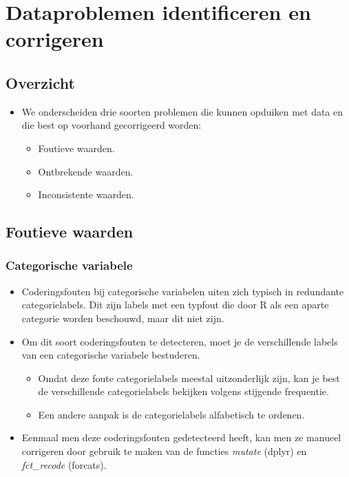 \documentclass[]{tufte-book}
\providecommand{\tightlist}{%
  \setlength{\itemsep}{0pt}\setlength{\parskip}{0pt}}
\begin{document}
\hypertarget{dataproblemen-identificeren-en-corrigeren}{%
\section{Dataproblemen identificeren en corrigeren}\label{dataproblemen-identificeren-en-corrigeren}}

\hypertarget{overzicht}{%
\subsection{Overzicht}\label{overzicht}}

\begin{itemize}
\tightlist
\item
  We onderscheiden drie soorten problemen die kunnen opduiken met data en die best op voorhand gecorrigeerd worden:

  \begin{itemize}
  \tightlist
  \item
    Foutieve waarden.
  \item
    Ontbrekende waarden.
  \item
    Inconsistente waarden.
  \end{itemize}
\end{itemize}

\hypertarget{foutieve-waarden}{%
\subsection{Foutieve waarden}\label{foutieve-waarden}}

\hypertarget{categorische-variabele-2}{%
\subsubsection{Categorische variabele}\label{categorische-variabele-2}}

\begin{itemize}
\tightlist
\item
  Coderingsfouten bij categorische variabelen uiten zich typisch in redundante categorielabels. Dit zijn labels met een typfout die door R als een aparte categorie worden beschouwd, maar dit niet zijn.
\item
  Om dit soort coderingsfouten te detecteren, moet je de verschillende labels van een categorische variabele bestuderen.

  \begin{itemize}
  \tightlist
  \item
    Omdat deze foute categorielabels meestal uitzonderlijk zijn, kan je best de verschillende categorielabels bekijken volgens stijgende frequentie.
  \item
    Een andere aanpak is de categorielabels alfabetisch te ordenen.
  \end{itemize}
\item
  Eenmaal men deze coderingsfouten gedetecteerd heeft, kan men ze manueel corrigeren door gebruik te maken van de functies \emph{mutate} (dplyr) en \emph{fct\_recode} (forcats).
\end{itemize}
\end{document}
